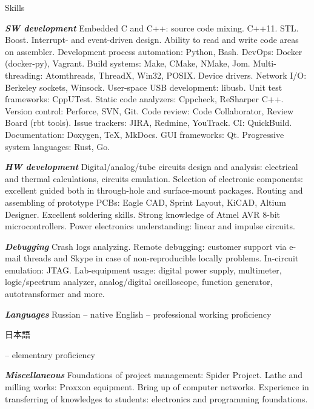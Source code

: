 \documentclass{template}
\begin{document}
\begin{rSection}{Skills}
\begin{rItemize}
\item \textbf{\textit{SW development}} \newline Embedded C and C++: source code mixing. C++11. STL. Boost. Interrupt- and event-driven design. Ability to read and write code areas on assembler. Development process automation: Python, Bash. DevOps: Docker (docker-py), Vagrant. Build systems: Make, CMake, NMake, Jom. Multi-threading: Atomthreads, ThreadX, Win32, POSIX. Device drivers. Network I/O: Berkeley sockets, Winsock. User-space USB development: libusb. Unit test frameworks: CppUTest. Static code analyzers: Cppcheck, ReSharper C++. Version control: Perforce, SVN, Git. Code review: Code Collaborator, Review Board (rbt tools). Issue trackers: JIRA, Redmine, YouTrack. CI: QuickBuild. Documentation: Doxygen, \TeX, MkDocs. GUI frameworks: Qt. Progressive system languages: Rust, Go.
\item \textbf{\textit{HW development}} \newline Digital/analog/tube circuits design and analysis: electrical and thermal calculations, circuits emulation. Selection of electronic components: excellent guided both in through-hole and surface-mount packages. Routing and assembling of prototype PCBs: Eagle CAD, Sprint Layout, KiCAD, Altium Designer. Excellent soldering skills. Strong knowledge of Atmel AVR 8-bit microcontrollers. Power electronics understanding: linear and impulse circuits.
\item \textbf{\textit{Debugging}} \newline Crash logs analyzing. Remote debugging: customer support via e-mail threads and Skype in case of non-reproducible locally problems. In-circuit emulation: JTAG. Lab-equipment usage: digital power supply, multimeter, logic/spectrum analyzer, analog/digital oscilloscope, function generator, autotransformer and more.
\item \textbf{\textit{Languages}} \newline Russian -- native \newline English -- professional working proficiency \newline \begin{CJK}{UTF8}{min}日本語\end{CJK} -- elementary proficiency
\item \textbf{\textit{Miscellaneous}} \newline Foundations of project management: Spider Project. Lathe and milling works: Proxxon equipment. Bring up of computer networks. Experience in transferring of knowledges to students: electronics and programming foundations.
\end{rItemize}
\end{rSection}
\end{document}
